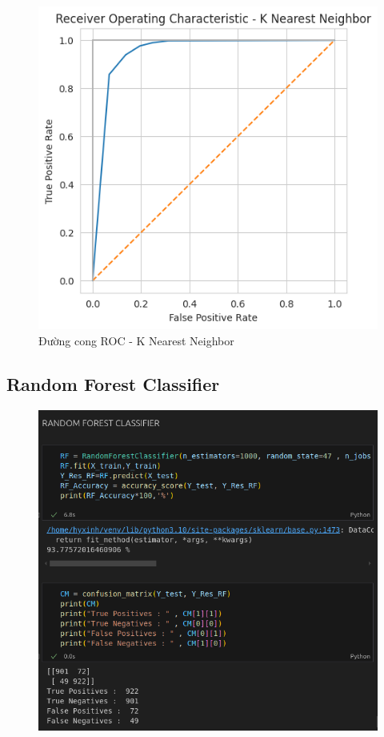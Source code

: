 \documentclass[11pt]{article}
\begin{document}
	\begin{figure}[H]
		\centering
		\includegraphics[width=0.7\linewidth]{KNN/DuongCongROC}
		\caption{Đường cong ROC - K Nearest Neighbor}
		\label{fig:duongcongroc}
	\end{figure}
	
	\subsection{Random Forest Classifier}
	
	\begin{figure}[H]
		\centering
		\includegraphics[width=0.7\linewidth]{RandomForestClassifier/screenshot008}
		\caption{}
		\label{fig:screenshot008}
	\end{figure}
	
\end{document}
